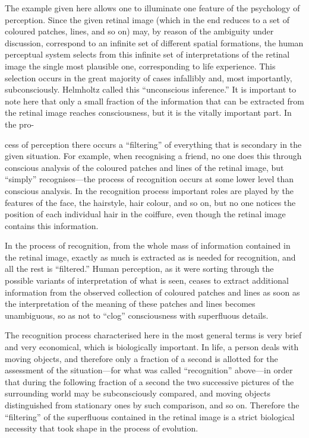 The example given here allows one to illuminate one feature of the psychology of
perception.  Since the given retinal image (which in the end reduces to a set of coloured
patches, lines, and so on) may, by reason of the ambiguity under discussion, correspond
to an infinite set of different spatial formations, the human perceptual system selects
from this infinite set of interpretations of the retinal image the single most plausible
one, corresponding to life experience.  This selection occurs in the great majority of
cases infallibly and, most importantly, subconsciously.  Helmholtz called this
``unconscious inference.''  It is important to note here that only a small fraction of
the information that can be extracted from the retinal image reaches consciousness, but
it is the vitally important part.  In the pro-



cess of perception there occurs a ``filtering'' of everything that is secondary in the
given situation.  For example, when recognising a friend, no one does this through
conscious analysis of the coloured patches and lines of the retinal image, but ``simply''
recognises---the process of recognition occurs at some lower level than conscious
analysis.  In the recognition process important roles are played by the features of the
face, the hairstyle, hair colour, and so on, but no one notices the position of each
individual hair in the coiffure, even though the retinal image contains this information.

In the process of recognition, from the whole mass of information contained in the retinal
image, exactly as much is extracted as is needed for recognition, and all the rest is
``filtered.''  Human perception, as it were sorting through the possible variants of
interpretation of what is seen, ceases to extract additional information from the
observed collection of coloured patches and lines as soon as the interpretation of the
meaning of these patches and lines becomes unambiguous, so as not to ``clog'' consciousness
with superfluous details.

The recognition process characterised here in the most general terms is very brief and
very economical, which is biologically important.  In life, a person deals with moving
objects, and therefore only a fraction of a second is allotted for the assessment of the
situation---for what was called ``recognition'' above---in order that during the following
fraction of a second the two successive pictures of the surrounding world may be
subconsciously compared, and moving objects distinguished from stationary ones by such
comparison, and so on.  Therefore the ``filtering'' of the superfluous contained in the
retinal image is a strict biological necessity that took shape in the process of evolution.

